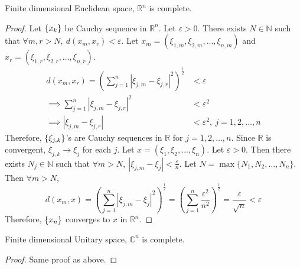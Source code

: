 \begin{theorem}
	Finite dimensional Euclidean space, $\mathbb{R}^n$ is complete.
\end{theorem}
\begin{proof}
	Let $\left\{x_k\right\}$ be Cauchy sequence in $\mathbb{R}^n$.
	Let $\varepsilon > 0$.
	There exists $N \in \mathbb{N}$ such that $\forall m,r > N,\ d(x_m,x_r) < \varepsilon$.
	Let $x_m = (\xi_{1,m},\xi_{2,m},\dots,\xi_{n,m})$ and $x_r = (\xi_{1,r},\xi_{2,r},\dots,\xi_{n,r})$.
	\begin{align*}
		d(x_m,x_r) = \left( \sum_{j=1}^n |\xi_{j,m} - \xi_{j,r}|^2 \right)^\frac{1}{2} & <  \varepsilon\\
		\implies \sum_{j=1}^n |\xi_{j,m} - \xi_{j,r}|^2 & <  \varepsilon^2 \\
		\implies |\xi_{j,m} - \xi_{j,r}| & < \varepsilon^2,\ j = 1,2,\dots,n
	\end{align*}
	Therefore, $\left\{\xi_{j,k}\right\}$'s are Cauchy sequences in $\mathbb{R}$ for $j = 1,2,\dots,n$.
	Since $\mathbb{R}$ is convergent, $\xi_{j,k} \to \xi_j$ for each $j$.
	Let $x = (\xi_1,\xi_2,\dots,\xi_n)$.
	Let $\varepsilon > 0$.
	Then there exists $N_j \in \mathbb{N}$ such that $\forall m > N,\ |\xi_{j,m} - \xi_j|  < \frac{\varepsilon}{n} $.
	Let $N = \max \{ N_1,N_2,\dots,N_n\}$.
	Then $\forall m > N$,
	\[ d(x_m,x) = \left( \sum_{j=1}^n | \xi_{j,m} - \xi_j|^2 \right)^\frac{1}{2} = \left( \sum_{j=1}^n \frac{\varepsilon^2}{n^2} \right)^\frac{1}{2} = \frac{\varepsilon}{\sqrt{n}} < \varepsilon \]
	Therefore, $\left\{x_n\right\}$ converges to $x$ in $\mathbb{R}^n$.
\end{proof}

\begin{theorem}
	Finite dimensional Unitary space, $\mathbb{C}^n$ is complete.
\end{theorem}
\begin{proof}
	Same proof as above.
\end{proof}

